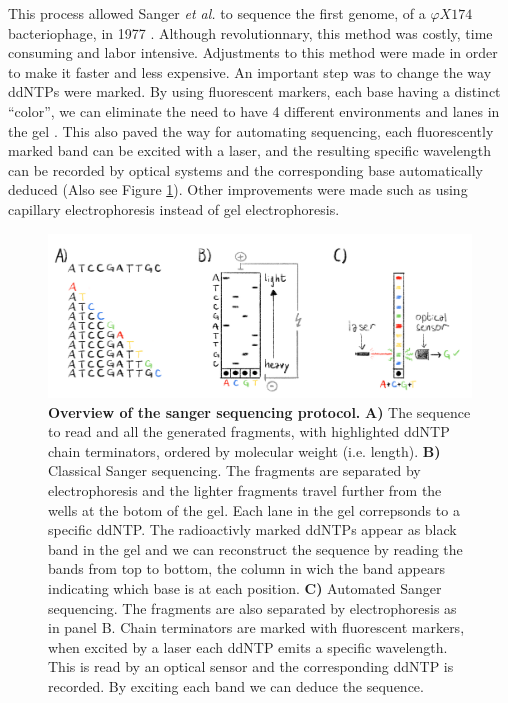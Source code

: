 \documentclass[
  11pt,
  twoside,
  BCOR=10mm,
  listof=totoc]{scrbook}
\newcommand{\extcaption}[2]{
    \caption[#1]{
        \textbf{#1}\newline
        #2
    }
}
\begin{document}
This process allowed Sanger \emph{et al.} to sequence the first genome, of a \(\varphi X174\) bacteriophage, in 1977 \autocite{sangerNucleotideSequenceBacteriophage1977}. Although revolutionnary, this method was costly, time consuming and labor intensive. Adjustments to this method were made in order to make it faster and less expensive. An important step was to change the way ddNTPs were marked. By using fluorescent markers, each base having a distinct ``color'', we can eliminate the need to have 4 different environments and lanes in the gel \autocite{smithSynthesisOligonucleotidesContaining1985,smithFluorescenceDetectionAutomated1986}. This also paved the way for automating sequencing, each fluorescently marked band can be excited with a laser, and the resulting specific wavelength can be recorded by optical systems and the corresponding base automatically deduced \autocite{ansorgeAutomatedDNASequencing1987} (Also see Figure \ref{fig:sanger}). Other improvements were made such as using capillary electrophoresis instead of gel electrophoresis.

\begin{figure}[h]
\centering
\includegraphics[width=0.8\linewidth]{./figures/Sequence-Intro/Sanger.png}
\extcaption{Overview of the sanger sequencing protocol.}{\textbf{A)} The sequence to read and all the generated fragments, with highlighted ddNTP chain terminators, ordered by molecular weight (i.e. length). \textbf{B)} Classical Sanger sequencing. The fragments are separated by electrophoresis and the lighter fragments travel further from the wells at the botom of the gel. Each lane in the gel correpsonds to a specific ddNTP. The radioactivly marked ddNTPs appear as black band in the gel and we can reconstruct the sequence by reading the bands from top to bottom, the column in wich the band appears indicating which base is at each position. \textbf{C)} Automated Sanger sequencing. The fragments are also separated by electrophoresis as in panel B. Chain terminators are marked with fluorescent markers, when excited by a laser each ddNTP emits a specific wavelength. This is read by an optical sensor and the corresponding ddNTP is recorded. By exciting each band we can deduce the sequence. }
\label{fig:sanger}
\end{figure}
\end{document}
